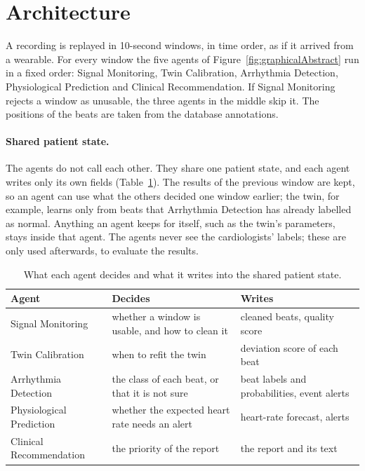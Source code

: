 \section{Architecture}
\label{section:architecture}

A recording is replayed in 10-second windows, in time order, as if it arrived from a wearable. For every window the five agents of Figure~\ref{fig:graphicalAbstract} run in a fixed order: Signal Monitoring, Twin Calibration, Arrhythmia Detection, Physiological Prediction and Clinical Recommendation. If Signal Monitoring rejects a window as unusable, the three agents in the middle skip it. The positions of the beats are taken from the database annotations.

\paragraph{Shared patient state.} The agents do not call each other. They share one patient state, and each agent writes only its own fields (Table~\ref{tab:agents}). The results of the previous window are kept, so an agent can use what the others decided one window earlier; the twin, for example, learns only from beats that Arrhythmia Detection has already labelled as normal. Anything an agent keeps for itself, such as the twin's parameters, stays inside that agent. The agents never see the cardiologists' labels; these are only used afterwards, to evaluate the results.

\begin{table}[H]
\caption{What each agent decides and what it writes into the shared patient state.}
\label{tab:agents}
\centering
\small
{}
\begin{tabularx}{\textwidth}{@{}>{\raggedright\arraybackslash}p{4.3cm}>{\raggedright\arraybackslash}X>{\raggedright\arraybackslash}p{4.4cm}@{}}
\toprule
\textbf{Agent} & \textbf{Decides} & \textbf{Writes} \\
\midrule
Signal Monitoring & whether a window is usable, and how to clean it & cleaned beats, quality score \\
Twin Calibration & when to refit the twin & deviation score of each beat \\
Arrhythmia Detection & the class of each beat, or that it is not sure & beat labels and probabilities, event alerts \\
Physiological Prediction & whether the expected heart rate needs an alert & heart-rate forecast, alerts \\
Clinical Recommendation & the priority of the report & the report and its text \\
\bottomrule
\end{tabularx}
\end{table}

